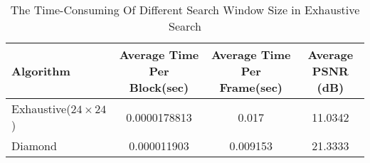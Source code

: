 \documentclass[]{article}
\begin{document}
	\begin{table}[H] %
		\label{tab:table_2}	
		\begin{tabular}{l c c c}
			Algorithm & Average Time Per Block(sec) & Average Time Per Frame(sec) & Average PSNR (dB)\\ \hline\hline 
			Exhaustive($24 \times 24  $) & 0.0000178813 & 0.017 & 11.0342\\  \hline
			Diamond & 0.000011903 & 0.009153 & 21.3333\\ \hline
		\end{tabular}
		\centering	
		\caption[The Time-Consuming Of Different Search Window Size in Exhaustive Search]{ The Time-Consuming Of Different Search Window Size in Exhaustive Search }
	\end{table}
		
		


\end{document}

